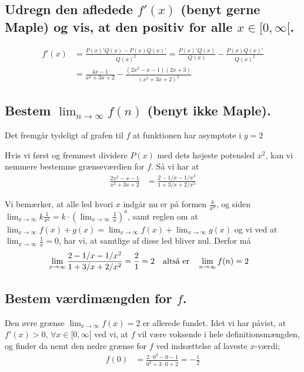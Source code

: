 \documentclass[11pt,a4paper]{article}
\newcommand{\limit}[2]{\lim_{#1 \rightarrow #2}}
\begin{document}
\subsection{\mdseries Udregn den afledede $f'(x)$ (benyt gerne Maple) og vis,
    at den positiv for alle $x \in [0,\infty[$.}
\begin{align}
    f'(x) &= \frac{P(x)' Q(x) - P(x) Q(x)'}{Q(x)^2}
           = \frac{P(x)' Q(x)}{Q(x)} - \frac{P(x) Q(x)'}{Q(x)^2} \\
          &= \frac{4x - 1}{x^2 + 3x + 2} -
             \frac{(2x^2 - x - 1) (2x + 3)}{(x^2 + 3x + 2)^2}
\end{align}

\subsection{\mdseries Bestem $\lim_{n \rightarrow \infty}f(n)$ (benyt ikke
    Maple).}
Det fremgår tydeligt af grafen til $f$ at funktionen har asymptote i $y = 2$

Hvis vi først og fremmest dividere $P(x)$ med dets højeste potensled $x^2$,
kan vi nemmere bestemme grænseværdien for $f$. Så vi har at
\begin{align}
    \frac{2x^2 - x - 1}{x^2 + 3x + 2} &= \frac{2 - 1/x - 1/x^2}{1 + 3/x + 2/x^2}
\end{align}

Vi bemærker, at alle led hvori $x$ indgår nu er på formen $\frac{k}{x^a}$,
og siden $\limit{x}{\infty} k \frac{1}{x^a} = k \cdot \left( \limit{x}{\infty}
\frac{1}{x} \right)^a$, samt reglen om at $\limit{x}{\infty} f(x) + g(x) =
\limit{x}{\infty} f(x) + \limit{x}{\infty} g(x)$ og vi ved at
$\limit{x}{\infty} \frac{1}{x} = 0$, har vi, at samtlige af disse led bliver
nul. Derfor må
\begin{align}
    \limit{x}{\infty}
    \frac{2 - 1/x - 1/x^2}{1 + 3/x + 2/x^2} &= \frac{2}{1} = 2
    \quad
    \text{\textnormal altså er}
    \quad
    \limit{n}{\infty} f(n) = 2
\end{align}

\subsection{\mdseries Bestem værdimængden for $f$.}
Den øvre grænse $\limit{x}{\infty} f(x) = 2$ er allerede fundet. Idet vi har
påvist, at $f'(x) > 0$, $\forall x \in [0, \infty[$ ved vi, at $f$ vil være
voksende i hele definitionsmængden, og finder da nemt den nedre grænse for
$f$ ved indsættelse af laveste $x$-værdi;
\begin{align}
    f(0) &= \frac{2 \cdot 0^2 - 0 - 1}{0^2 + 3 \cdot 0 + 2}
          = -\frac{1}{2}
\end{align}
\end{document}
